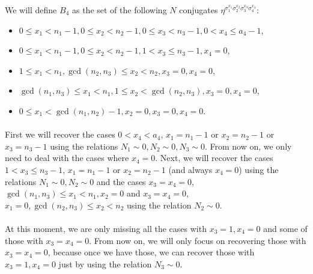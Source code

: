 We will define $B_4$ as the set of the following $N$ conjugates $\eta^{\sigma_1^{x_1}\sigma_2^{x_2}\sigma_3^{x_3}\sigma_4^{x_4}}$:
\begin{itemize}
\item $0\leq x_1<n_1-1, 0\leq x_2<n_2-1, 0\leq x_3<n_3-1, 0<x_4\leq a_4-1$,
\item $0\leq x_1<n_1-1, 0\leq x_2<n_2-1, 1< x_3 \leq n_3-1, x_4=0$,
\item $1\leq x_1< n_1, \gcd(n_2,n_3)\leq x_2<n_2, x_3=0, x_4=0$,
\item $\gcd(n_1,n_3)\leq x_1< n_1, 1\leq x_2<\gcd(n_2,n_3), x_3=0, x_4=0$,
\item $0\leq x_1 <\gcd(n_1,n_2)-1, x_2=0, x_3=0, x_4=0$.
\end{itemize}

\paragraph*{}
First we will recover the cases $0<x_4<a_4$, $x_1=n_1-1$ or $x_2=n_2-1$ or $x_3=n_3-1$ using the relations $N_1\sim 0, N_2\sim 0, N_3\sim 0$. From now on, we only need to deal with the cases where $x_4=0$. Next, we will recover the cases $1< x_3 \leq n_3-1$, $x_1=n_1-1$ or $x_2=n_2-1$ (and always $x_4=0$) using the relations $N_1\sim 0, N_2\sim 0$ and the cases $x_3=x_4=0$, $\gcd(n_1,n_3)\leq x_1< n_1,x_2=0$ and  $x_3=x_4=0$, $x_1=0, \gcd(n_2,n_3)\leq x_2<n_2$ using the relation $N_2\sim 0$.
\paragraph*{}
At this moment, we are only missing all the cases with $x_3=1,x_4=0$ and some of those with $x_3=x_4=0$. From now on, we will only focus on recovering those with $x_3=x_4=0$, because once we have those, we can recover those with $x_3=1,x_4=0$ just by using the relation $N_3\sim 0$.

